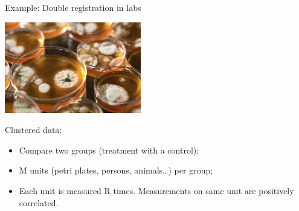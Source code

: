 \documentclass[
  ignorenonframetext,
]{beamer}
\begin{document}
\begin{frame}

\begin{block}{Example: Double registration in labs}

\small

\normalsize

\includegraphics[width=\textwidth,height=1.5625in]{img/190108-dish-full.jpg}

Clustered data:

\begin{itemize}
\item
  Compare two groups (treatment with a control);
\item
  M units (petri plates, persons, animals\ldots) per group;
\item
  Each unit is measured R times. Measurements on same unit are
  positively correlated.
\end{itemize}

\end{block}

\end{frame}
\end{document}
